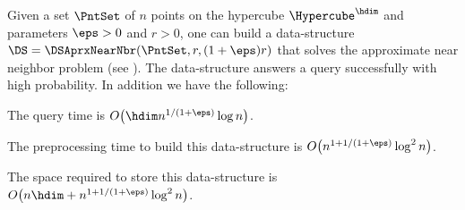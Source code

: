 \begin{theorem}
    Given a set $\PntSet$ of $n$ points on the hypercube
    $\Hypercube^\hdim$ and parameters $\eps>0$ and $r > 0$, one can
    build a data-structure $\DS = \DSAprxNearNbr(\PntSet,r,(1+\eps)r)$
    that solves the approximate near neighbor problem (see
    ).  The data-structure answers a query
    successfully with high probability. In addition we have the
    following:
    \begin{compactenumA}
        \smallskip%
        \item The query time is
        $O\bigl(\hdim n^{1/(1+\eps)} \log n \bigr)$.

        \smallskip%
        \item The preprocessing time to build this data-structure is
        $O\bigl(n^{1+1/(1+\eps)} \log^2 n \bigr)$.

        \smallskip%
        \item The space required to store this data-structure is
        $O\bigl(n\hdim + n^{1+1/(1+\eps)} \log^2 n \bigr)$.
    \end{compactenumA}
\end{theorem}
